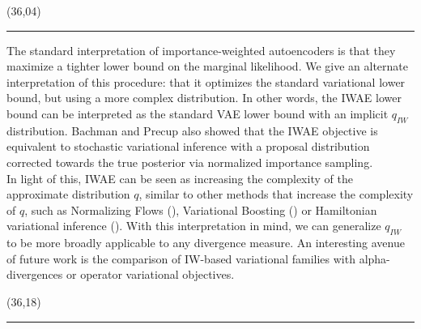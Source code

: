 \documentclass{article}
\def\CHead#1{\begin{center}\noindent{\LARGE\color{DarkBlue} #1}\end{center}}
\renewcommand{\small}{\fontsize{20.74}{25}\selectfont}
\renewcommand{\LARGE}{\fontsize{43}{54}\selectfont}
\begin{document}
\begin{textblock}{10}(36,04)
\CHead{Discussion}
\hrule
\vspace{3mm}
The standard interpretation of importance-weighted autoencoders is that they maximize a tighter lower bound on the marginal likelihood.
We give an alternate interpretation of this procedure: that it optimizes the standard variational lower bound, but using a more complex distribution. In other words, the IWAE lower bound can be interpreted as the standard VAE lower bound with an implicit $q_{IW}$ distribution. Bachman and Precup \cite{bachman} also showed that the IWAE objective is equivalent to stochastic variational inference with a proposal distribution corrected towards the true posterior via normalized importance sampling. %
\\

In light of this, IWAE can be seen as increasing the complexity of the approximate distribution $q$, similar to other methods that increase the complexity of $q$, such as Normalizing Flows (\cite{normflow}), Variational Boosting (\cite{varboosting}) or Hamiltonian variational inference (\cite{salimans2015markov}). With this interpretation in mind, we can generalize $q_{IW}$ to be more broadly applicable to any divergence measure. An interesting avenue of future work is the comparison of IW-based variational families with alpha-divergences or operator variational objectives. 
\end{textblock}



% 


\begin{textblock}{10}(36,18)
\CHead{References}
\hrule
\vspace{3mm}

\small{}
\end{textblock}
\end{document}

